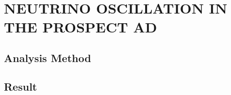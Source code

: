 \chapter{\uppercase{Neutrino Oscillation in the PROSPECT AD}}

\section{Analysis Method}

\section{Result}

